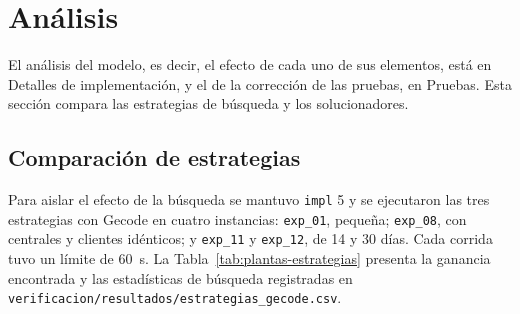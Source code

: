 \section{Análisis}

El análisis del modelo, es decir, el efecto de cada uno de sus elementos, está en Detalles de implementación, y el de la corrección de las pruebas, en Pruebas. Esta sección compara las estrategias de búsqueda y los solucionadores.

\subsection{Comparación de estrategias}

Para aislar el efecto de la búsqueda se mantuvo \texttt{impl} 5 y se ejecutaron las tres estrategias con Gecode en cuatro instancias: \texttt{exp\_01}, pequeña; \texttt{exp\_08}, con centrales y clientes idénticos; y \texttt{exp\_11} y \texttt{exp\_12}, de 14 y 30 días. Cada corrida tuvo un límite de 60~s. La Tabla~\ref{tab:plantas-estrategias} presenta la ganancia encontrada y las estadísticas de búsqueda registradas en \texttt{verificacion/resultados/estrategias\_gecode.csv}.

